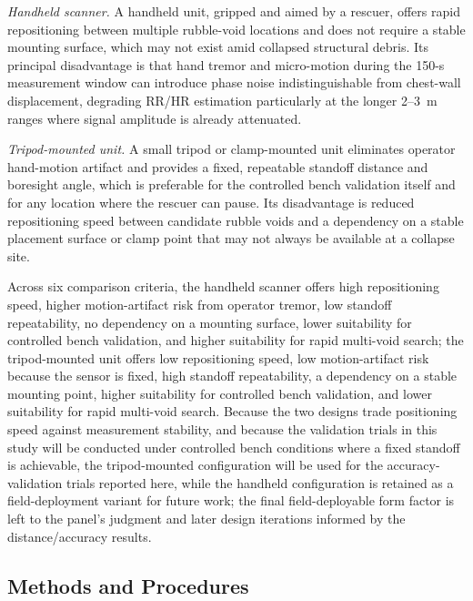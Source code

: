 \documentclass[10pt,conference]{IEEEtran}
\begin{document}
\textit{Handheld scanner.} A handheld unit, gripped and aimed by a rescuer, offers rapid repositioning between multiple rubble-void locations and does not require a stable mounting surface, which may not exist amid collapsed structural debris. Its principal disadvantage is that hand tremor and micro-motion during the 150-s measurement window can introduce phase noise indistinguishable from chest-wall displacement, degrading RR/HR estimation particularly at the longer 2--3~m ranges where signal amplitude is already attenuated.

\textit{Tripod-mounted unit.} A small tripod or clamp-mounted unit eliminates operator hand-motion artifact and provides a fixed, repeatable standoff distance and boresight angle, which is preferable for the controlled bench validation itself and for any location where the rescuer can pause. Its disadvantage is reduced repositioning speed between candidate rubble voids and a dependency on a stable placement surface or clamp point that may not always be available at a collapse site.

Across six comparison criteria, the handheld scanner offers high repositioning speed, higher motion-artifact risk from operator tremor, low standoff repeatability, no dependency on a mounting surface, lower suitability for controlled bench validation, and higher suitability for rapid multi-void search; the tripod-mounted unit offers low repositioning speed, low motion-artifact risk because the sensor is fixed, high standoff repeatability, a dependency on a stable mounting point, higher suitability for controlled bench validation, and lower suitability for rapid multi-void search. Because the two designs trade positioning speed against measurement stability, and because the validation trials in this study will be conducted under controlled bench conditions where a fixed standoff is achievable, the tripod-mounted configuration will be used for the accuracy-validation trials reported here, while the handheld configuration is retained as a field-deployment variant for future work; the final field-deployable form factor is left to the panel's judgment and later design iterations informed by the distance/accuracy results.

\subsection{Methods and Procedures}
\end{document}
